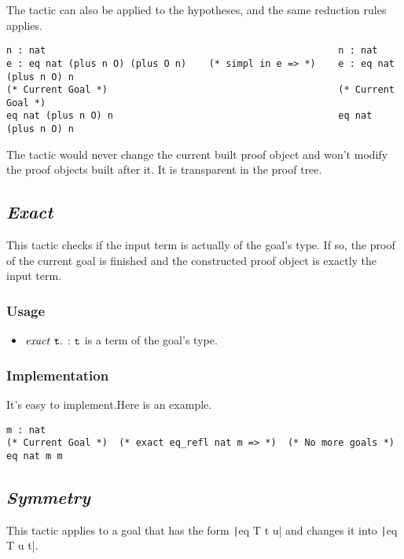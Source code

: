 The tactic can also be applied to the hypotheses, and the same reduction rules applies.
\begin{center}
\begin{verbatim}
n : nat                                                    n : nat                
e : eq nat (plus n O) (plus O n)    (* simpl in e => *)    e : eq nat (plus n O) n
(* Current Goal *)                                         (* Current Goal *)      
eq nat (plus n O) n                                        eq nat (plus n O) n         
\end{verbatim} 
\end{center}

The tactic would never change the current built proof object and won't modify the proof objects built after it.
It is transparent in the proof tree.

\subsection{\it Exact}

This tactic checks if the input term is actually of the goal's type. If so, the proof of the current goal is finished and the 
constructed proof object is exactly the input term.

\subsubsection*{Usage}
\begin{itemize}
\item ${\it exact}\ \tt t.$ : $\tt t$ is a term of the goal's type. 
\end{itemize}

\subsubsection*{Implementation}
It's easy to implement.Here is an example.
\begin{center}
\begin{minipage}{0.7\textwidth}
\begin{verbatim}
m : nat                                                      
(* Current Goal *)  (* exact eq_refl nat m => *)  (* No more goals *)
eq nat m m                                       
\end{verbatim}
\end{minipage}
\end{center}


\subsection{\it Symmetry}
This tactic applies to a goal that has the form \texttt|eq T t u| and changes it into \texttt|eq T u t|.


